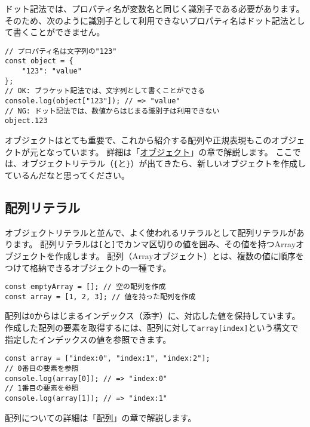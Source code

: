 ドット記法では、プロパティ名が変数名と同じく識別子である必要があります。
そのため、次のように識別子として利用できないプロパティ名はドット記法として書くことができません。

\begin{lstlisting}
// プロパティ名は文字列の"123"
const object = {
    "123": "value"
};
// OK: ブラケット記法では、文字列として書くことができる
console.log(object["123"]); // => "value"
// NG: ドット記法では、数値からはじまる識別子は利用できない
object.123
\end{lstlisting}

オブジェクトはとても重要で、これから紹介する配列や正規表現もこのオブジェクトが元となっています。
詳細は「\hyperlink{object}{オブジェクト}」の章で解説します。
ここでは、オブジェクトリテラル（\texttt{\{}と\texttt{\}}）が出てきたら、新しいオブジェクトを作成しているんだなと思ってください。
\vspace{-2mm}
\hypertarget{array-literal}{%
\subsection{配列リテラル}\label{array-literal}}
\vspace{-1mm}
オブジェクトリテラルと並んで、よく使われるリテラルとして配列リテラルがあります。
配列リテラルは\texttt{[}と\texttt{]}でカンマ区切りの値を囲み、その値を持つArrayオブジェクトを作成します。
配列（Arrayオブジェクト）とは、複数の値に順序をつけて格納できるオブジェクトの一種です。

\begin{lstlisting}
const emptyArray = []; // 空の配列を作成
const array = [1, 2, 3]; // 値を持った配列を作成
\end{lstlisting}

\enlargethispage{\baselineskip}\enlargethispage{\baselineskip}配列は\texttt{0}からはじまるインデックス（添字）に、対応した値を保持しています。
作成した配列の要素を取得するには、配列に対して\texttt{array[index]}という構文で指定したインデックスの値を参照できます。

\begin{lstlisting}
const array = ["index:0", "index:1", "index:2"];
// 0番目の要素を参照
console.log(array[0]); // => "index:0"
// 1番目の要素を参照
console.log(array[1]); // => "index:1"
\end{lstlisting}

配列についての詳細は「\hyperlink{array}{配列}」の章で解説します。

